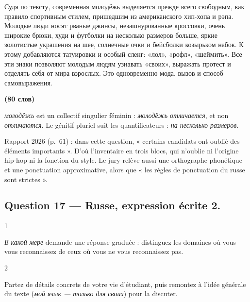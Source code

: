 \documentclass[11pt,a4paper]{article}
\begin{document}
Судя по тексту, современная молодёжь выделяется прежде всего свободным, как правило спортивным стилем, пришедшим из американского хип-хопа и рэпа. Молодые люди носят рваные джинсы, незашнурованные кроссовки, очень широкие брюки, худи и футболки на несколько размеров больше, яркие золотистые украшения на шее, солнечные очки и бейсболки козырьком набок. К этому добавляются татуировки и особый сленг: «лол», «рофл», «шеймить». Все эти знаки позволяют молодым людям узнавать «своих», выражать протест и отделять себя от мира взрослых. Это одновременно мода, вызов и способ самовыражения.

\textbf{(80 слов)}

\begin{piege}

\emph{молодёжь} est un collectif singulier féminin : \emph{молодёжь отличается}, et non \emph{отличаются}. Le génitif pluriel suit les quantificateurs : \emph{на несколько размеров}.

\end{piege}

\begin{jury}

Rapport 2026 (p.~61) : dans cette question, « certains candidats ont oublié des éléments importants ». D'où l'inventaire en trois blocs, qui n'oublie ni l'origine hip-hop ni la fonction du style. Le jury relève aussi une orthographe phonétique et une ponctuation approximative, alors que « les règles de ponctuation du russe sont strictes ».

\end{jury}

\hypertarget{question-17-russe-expression-uxe9crite-2.}{%
\subsection{Question 17 --- Russe, expression écrite 2.}\label{question-17-russe-expression-uxe9crite-2.}}

\begin{indication}{1}

\emph{В какой мере} demande une réponse graduée : distinguez les domaines où vous vous reconnaissez de ceux où vous ne vous reconnaissez pas.

\end{indication}

\begin{indication}{2}

Partez de détails concrets de votre vie d'étudiant, puis remontez à l'idée générale du texte (\emph{мой язык --- только для своих}) pour la discuter.

\end{indication}
\end{document}
